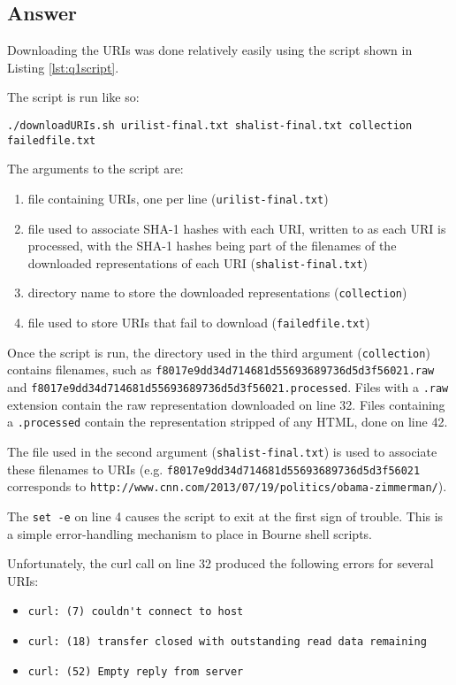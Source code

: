 \documentclass[letterpaper,11pt]{article}
\begin{document}
\newpage
\subsection*{Answer}

Downloading the URIs was done relatively easily using the script shown in Listing \ref{lst:q1script}.

The script is run like so:
\begin{lstlisting}[frame=single]
./downloadURIs.sh urilist-final.txt shalist-final.txt collection failedfile.txt
\end{lstlisting}

The arguments to the script are:
\begin{enumerate}
\item file containing URIs, one per line (\verb+urilist-final.txt+)
\item file used to associate SHA-1 hashes with each URI, written to as each URI is processed, with the SHA-1 hashes being part of the filenames of the downloaded representations of each URI (\verb+shalist-final.txt+)
\item directory name to store the downloaded representations (\verb+collection+)
\item file used to store URIs that fail to download (\verb+failedfile.txt+)
\end{enumerate}

Once the script is run, the directory used in the third argument (\verb+collection+) contains filenames, such as \verb+f8017e9dd34d714681d55693689736d5d3f56021.raw+ and \verb+f8017e9dd34d714681d55693689736d5d3f56021.processed+.  Files with a \verb+.raw+ extension contain the raw representation downloaded on line 32.  Files containing a \verb+.processed+ contain the representation stripped of any HTML, done on line 42.

The file used in the second argument (\verb+shalist-final.txt+) is used to associate these filenames to URIs (e.g. \verb+f8017e9dd34d714681d55693689736d5d3f56021+ corresponds to \verb+http://www.cnn.com/2013/07/19/politics/obama-zimmerman/+).

The \verb+set -e+ on line 4 causes the script to exit at the first sign of trouble.  This is a simple error-handling mechanism to place in Bourne shell scripts.

Unfortunately, the curl call on line 32 produced the following errors for several URIs:
\begin{itemize}
\item \verb+curl: (7) couldn't connect to host+
\item \verb+curl: (18) transfer closed with outstanding read data remaining+
\item \verb+curl: (52) Empty reply from server+
\end{itemize}
\end{document}
